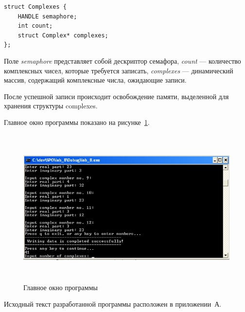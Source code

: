 \begin{lstlisting}[caption=Структура Complexes,
  label=lst:complexes]
struct Complexes {
	HANDLE semaphore;
	int count;
	struct Complex* complexes;
};
\end{lstlisting}

Поле \textit{semaphore} представляет собой дескриптор семафора,
\textit{count} --- количество комплексных чисел, которые требуется записать,
\textit{complexes} --- динамический массив, содержащий комплексные числа, ожидающие записи.

После успешной записи происходит освобождение памяти, выделенной 
для хранения структуры complexes.

Главное окно программы показано на рисунке~\ref{fig:main_screen}.

\begin{figure}[htbp]
  \centering
  \includegraphics[width=150mm,height=80mm]{img/main_screen}
  \caption{Главное окно программы}\label{fig:main_screen}
\end{figure}


Исходный текст разработанной программы расположен в приложении~А.

\newpage
